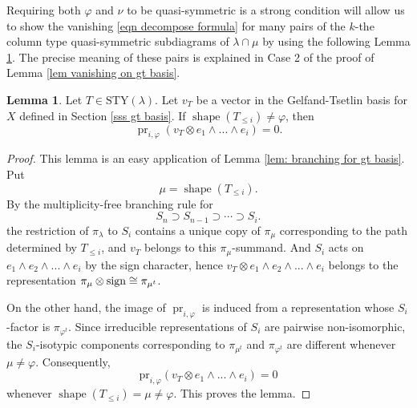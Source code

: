 \documentclass[11pt]{amsart}
\numberwithin{equation}{section}
\theoremstyle{definition}
\newtheorem{lemma}[thm]{Lemma}
\renewcommand{\phi}{\varphi}
\begin{document}
Requiring both $\phi$ and $\nu$ to be quasi-symmetric is a strong condition will allow us to show the vanishing  \eqref{eqn decompose formula} for many pairs of the \(k\)-the column type quasi-symmetric subdiagrams of \(\lambda \cap \mu\) by using the following Lemma \ref{projection}. The precise meaning of these pairs is explained in Case 2 of the proof of Lemma \ref{lem vanishing on gt   basis}.

\begin{lemma}\label{projection}
   Let \(T \in \mathrm{STY}(\lambda)\). Let $v_{T}$ be a vector in the Gelfand-Tsetlin basis for \(X\) defined in Section \ref{sss gt basis}. If $\operatorname{shape}(T_{\leq i})\neq\phi$, then 
   \[
   \operatorname{pr}_{i,\phi}(v_{T}\otimes e_{1}\wedge...\wedge e_{i})=0.
   \]
\end{lemma}

\begin{proof}
This lemma is an easy application of Lemma \ref{lem: branching for gt basis}.
Put
\[
\mu=\operatorname{shape}(T_{\leq i}).
\]
By the multiplicity-free branching rule for
\[
S_n\supset S_{n-1}\supset\cdots\supset S_i .
\]
the restriction of $\pi_{\lambda}$ to $S_{i}$ contains a unique copy of $\pi_{\mu}$ corresponding to the path determined by $T_{\leq i}$, and $v_{T}$ belongs to this $\pi_{\mu}$-summand. 
And $S_{i}$ acts on $e_{1}\wedge e_{2}\wedge...\wedge e_{i}$ by the sign character, hence $v_{T}\otimes e_{1}\wedge e_{2}\wedge...\wedge e_{i}$ belongs to the representation $\pi_{\mu}\otimes \textnormal{sign}\cong\pi_{\mu^{t}}$.

On the other hand, the image of $\operatorname{pr}_{i,\phi}$ is induced from a representation whose $S_{i}$-factor is $\pi_{\phi^{t}}$. Since irreducible representations of $S_{i}$ are pairwise non-isomorphic, the $S_{i}$-isotypic components corresponding to $\pi_{\mu^{t}}$ and $\pi_{\phi^{t}}$ are different whenever $\mu\neq\phi$. Consequently,
 \[
   \mathrm{pr}_{i,\phi}(v_{T}\otimes e_{1}\wedge...\wedge e_{i})=0
   \]
   whenever $\operatorname{shape}(T_{\leq i})=\mu\neq\phi$.
This proves the lemma.
\end{proof}
\end{document}
